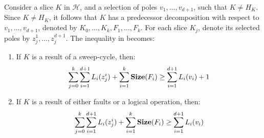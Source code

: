   \begin{corollary}
    \label{claim:shrinkslice}
    Consider a slice $K$ in $\mathcal{H}$, and a selection of poles $v_{1}, \ldots, v_{d+1}$, such that $K \neq H_{K}$. Since $K \neq H_{K}$, it follows that $K$ has a predecessor decomposition with respect to $v_{1}, \ldots, v_{d+1}$, denoted by $K_{0}, \ldots, K_{k}, F_{1}, \ldots, F_{k}$. For each slice $K_{j}$, denote its selected poles by $z_{j}^{1}, \ldots, z_{j}^{d+1}$. The inequality in  becomes:
    \begin{enumerate}
      \item If $K$ is a result of a sweep-cycle, then:
        \begin{equation*}
          \begin{split}
            \sum_{j=0}^{k}\sum_{i=1}^{d+1} L_{i}(z_{j}^{i}) +  \sum^{k}_{i=1}\mathbf{Size}(F_{i}) \ge \sum_{i=1}^{d+1}L_{i}(v_i) + 1
          \end{split}
        \end{equation*}
          \item If $K$ is a result of either faults or a logical operation, then: 
        \begin{equation*}
          \begin{split}
            \sum_{j=0}^{k}\sum_{i=1}^{d+1} L_{i}(z_{j}^{i}) +  \sum^{k}_{i=1}\mathbf{Size}(F_{i}) \ge \sum_{i=1}^{d+1}L_{i}(v_i)   
          \end{split}
        \end{equation*}
      \end{enumerate}
  \end{corollary}
